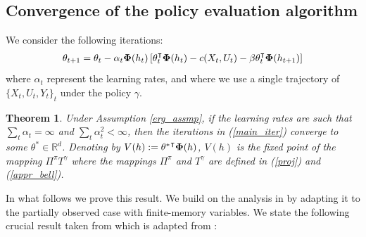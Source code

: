 \documentclass[letterpaper, 10 pt, conference]{ieeeconf}  %
\newtheorem{theorem}{Theorem}
\theoremstyle{definition}
\theoremstyle{remark}
\begin{document}
\subsection{Convergence of the policy evaluation algorithm}  We consider the following iterations:
\begin{align}\label{main_iter}
\theta_{t+1}= \theta_t - \alpha_t {\bf \Phi}(h_t) \left[\theta_t^\intercal {\bf \Phi}(h_t) - c(X_t,U_t) - \beta \theta^\intercal_t{\bf \Phi}(h_{t+1}) \right]
\end{align}
where $\alpha_t$ represent the learning rates, and where we use a single trajectory of $\{X_t,U_t,Y_t\}_{t}$ under the policy $\gamma$.
\begin{theorem}\label{main_thm}
Under Assumption \ref{erg_assmp}, if the learning rates are such that $\sum_t\alpha_t = \infty$ and $\sum_t \alpha_t^2<\infty$, then the iterations in (\ref{main_iter}) converge to some $\theta^* \in\mathds{R}^d$. Denoting by $V(h):={\theta^*}^\intercal {\bf \Phi}(h)$, $V(h)$ is the fixed point of the mapping $\Pi^\pi T^\gamma $ where the mappings $\Pi^\pi$ and $T^\gamma$ are defined in (\ref{proj}) and (\ref{appr_bell}).
\end{theorem}
In what follows we prove this result. We build on the analysis in \cite{tsitsiklis1997analysis} by adapting it to the partially observed case with finite-memory variables. We state the following crucial result taken from \cite[Theorem 2]{tsitsiklis1997analysis} which is adapted from \cite[Theorem 17, p. 239]{benveniste2012adaptive}:
\end{document}
